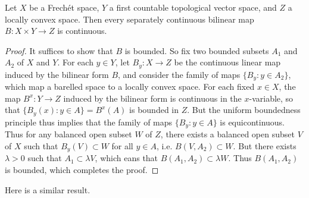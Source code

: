 \begin{theorem}
    Let $X$ be a Frech\'{e}t space, $Y$ a first countable topological vector space, and $Z$ a locally convex space. Then every separately continuous bilinear map $B: X \times Y \to Z$ is continuous.
\end{theorem}
\begin{proof}
    It suffices to show that $B$ is bounded. So fix two bounded subsets $A_1$ and $A_2$ of $X$ and $Y$. For each $y \in Y$, let $B_y: X \to Z$ be the continuous linear map induced by the bilinear form $B$, and consider the family of maps $\{ B_y: y \in A_2 \}$, which map a barelled space to a locally convex space. For each fixed $x \in X$, the map $B^x: Y \to Z$ induced by the bilinear form is continuous in the $x$-variable, so that $\{ B_y(x): y \in A \} = B^x(A)$ is bounded in $Z$. But the uniform boundedness principle thus implies that the family of maps $\{ B_y : y \in A \}$ is equicontinuous. Thus for any balanced open subset $W$ of $Z$, there exists a balanced open subset $V$ of $X$ such that $B_y(V) \subset W$ for all $y \in A$, i.e. $B(V,A_2) \subset W$. But there exists $\lambda > 0$ such that $A_1 \subset \lambda V$, which eans that $B(A_1,A_2) \subset \lambda W$. Thus $B(A_1,A_2)$ is bounded, which completes the proof.
\end{proof}

Here is a similar result.

